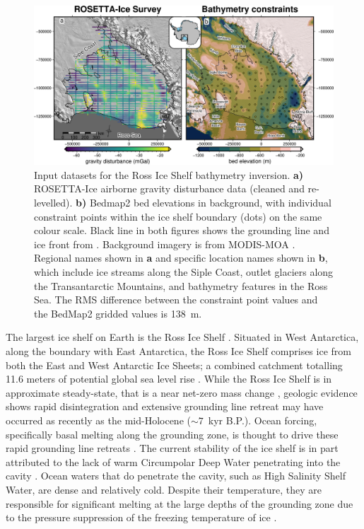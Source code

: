 \begin{figure}[!ht]
    \centering
    \includegraphics[width=.95\textwidth]{figures/chp4/inversion_inputs.png}
    \caption[Ross Ice Shelf inversion inputs]{Input datasets for the Ross Ice Shelf bathymetry inversion. \textbf{a)} ROSETTA-Ice airborne gravity disturbance data (cleaned and re-levelled). \textbf{b)} Bedmap2 bed elevations in background, with individual constraint points within the ice shelf boundary (dots) on the same colour scale. Black line in both figures shows the grounding line and ice front from \citet{mouginotmeasures2017}. Background imagery is from MODIS-MOA \citep{scambosmodisbased2007}. Regional names shown in \textbf{a} and specific location names shown in \textbf{b}, which include ice streams along the Siple Coast, outlet glaciers along the Transantarctic Mountains, and bathymetry features in the Ross Sea. The RMS difference between the constraint point values and the BedMap2 gridded values is 138~m.}
    \label{fig:chp4_inversion_inputs}
\end{figure}


The largest ice shelf on Earth is the Ross Ice Shelf \citep[Figure \ref{fig:chp4_inversion_inputs},][]{fretwellbedmap22013}. Situated in West Antarctica, along the boundary with East Antarctica, the Ross Ice Shelf comprises ice from both the East and West Antarctic Ice Sheets; a combined catchment totalling 11.6 meters of potential global sea level rise \citep{tintoross2019}. While the Ross Ice Shelf is in approximate steady-state, that is a near net-zero mass change \citep[e.g.,][]{moholdtbasal2014, rignoticeshelf2013}, geologic evidence shows rapid disintegration \citep{naishobliquitypaced2009, yokoyamawidespread2016} and extensive grounding line retreat \citep{venturellimid2020, spectorrapid2017} may have occurred as recently as the mid-Holocene ($\sim7$~kyr B.P.). Ocean forcing, specifically basal melting along the grounding zone, is thought to drive these rapid grounding line retreats \citep{lowrydeglacial2019}. The current stability of the ice shelf is in part attributed to the lack of warm Circumpolar Deep Water penetrating into the cavity \citep{tintoross2019, dinnimanmodel2011}. Ocean waters that do penetrate the cavity, such as High Salinity Shelf Water, are dense and relatively cold. Despite their temperature, they are responsible for significant melting at the large depths of the grounding zone \citep{adusumilliinterannual2020} due to the pressure suppression of the freezing temperature of ice \citep{tintoross2019}. \\

